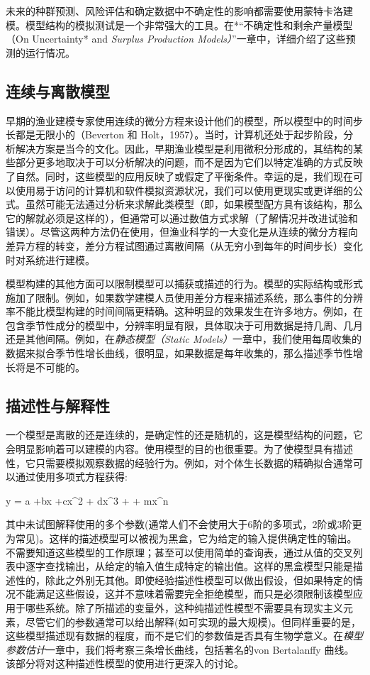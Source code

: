 \documentclass[
  lang=cn,
  11pt,
  scheme=chinese,
  chinesefont=nofont,
  citestyle=gb7714-2015,
  bibstyle=gb7714-2015]{elegantbook}
\begin{document}
未来的种群预测、风险评估和确定数据中不确定性的影响都需要使用蒙特卡洛建模。模型结构的模拟测试是一个非常强大的工具。在*``不确定性和剩余产量模型（On Uncertainty* and \emph{Surplus Production Models）}''一章中，详细介绍了这些预测的运行情况。

\subsection{连续与离散模型}\label{ux8fdeux7eedux4e0eux79bbux6563ux6a21ux578b}

早期的渔业建模专家使用连续的微分方程来设计他们的模型，所以模型中的时间步长都是无限小的（Beverton 和 Holt，1957）。当时，计算机还处于起步阶段，分析解决方案是当今的文化。因此，早期渔业模型是利用微积分形成的，其结构的某些部分更多地取决于可以分析解决的问题，而不是因为它们以特定准确的方式反映了自然。同时，这些模型的应用反映了或假定了平衡条件。幸运的是，我们现在可以使用易于访问的计算机和软件模拟资源状况，我们可以使用更现实或更详细的公式。虽然可能无法通过分析来求解此类模型（即，如果模型配方具有该结构，那么它的解就必须是这样的），但通常可以通过数值方式求解（了解情况并改进试验和错误）。尽管这两种方法仍在使用，但渔业科学的一大变化是从连续的微分方程向差异方程的转变，差分方程试图通过离散间隔（从无穷小到每年的时间步长）变化时对系统进行建模。

模型构建的其他方面可以限制模型可以捕获或描述的行为。模型的实际结构或形式施加了限制。例如，如果数学建模人员使用差分方程来描述系统，那么事件的分辨率不能比模型构建的时间间隔更精确。这种明显的效果发生在许多地方。例如，在包含季节性成分的模型中，分辨率明显有限，具体取决于可用数据是持几周、几月还是其他间隔。例如，在\emph{静态模型（Static Models）}一章中，我们使用每周收集的数据来拟合季节性增长曲线，很明显，如果数据是每年收集的，那么描述季节性增长将是不可能的。

\subsection{描述性与解释性}\label{ux63cfux8ff0ux6027ux4e0eux89e3ux91caux6027}

一个模型是离散的还是连续的，是确定性的还是随机的，这是模型结构的问题，它会明显影响着可以建模的内容。使用模型的目的也很重要。为了使模型具有描述性，它只需要模拟观察数据的经验行为。例如，对个体生长数据的精确拟合通常可以通过使用多项式方程获得:

y = a +bx +cx^2 + dx^3 + \cdots + mx^n
\label{eq:eq13}

其中未试图解释使用的多个参数(通常人们不会使用大于6阶的多项式，2阶或3阶更为常见)。这样的描述模型可以被视为黑盒，它为给定的输入提供确定性的输出。不需要知道这些模型的工作原理；甚至可以使用简单的查询表，通过从值的交叉列表中逐字查找输出，从给定的输入值生成特定的输出值。这样的黑盒模型只能是描述性的，除此之外别无其他。即使经验描述性模型可以做出假设，但如果特定的情况不能满足这些假设，这并不意味着需要完全拒绝模型，而只是必须限制该模型应用于哪些系统。除了所描述的变量外，这种纯描述性模型不需要具有现实主义元素，尽管它们的参数通常可以给出解释(如可实现的最大规模)。但同样重要的是，这些模型描述现有数据的程度，而不是它们的参数值是否具有生物学意义。在\emph{模型参数估计}一章中，我们将考察三条增长曲线，包括著名的von Bertalanffy 曲线。该部分将对这种描述性模型的使用进行更深入的讨论。
\end{document}
